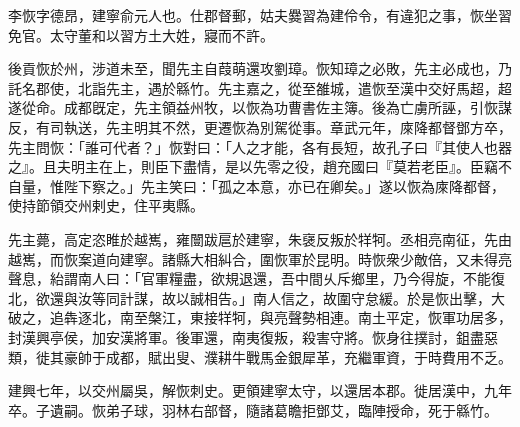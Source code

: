 \begin{pinyinscope}
 
 
 李恢字德昂，建寧俞元人也。仕郡督郵，姑夫爨習為建伶令，有違犯之事，恢坐習免官。太守董和以習方土大姓，寢而不許。
 
 
 後貢恢於州，涉道未至，聞先主自葭萌還攻劉璋。恢知璋之必敗，先主必成也，乃託名郡使，北詣先主，遇於緜竹。先主嘉之，從至雒城，遣恢至漢中交好馬超，超遂從命。成都旣定，先主領益州牧，以恢為功曹書佐主簿。後為亡虜所誣，引恢謀反，有司執送，先主明其不然，更遷恢為別駕從事。章武元年，庲降都督鄧方卒，先主問恢：「誰可代者？」恢對曰：「人之才能，各有長短，故孔子曰『其使人也器之』。且夫明主在上，則臣下盡情，是以先零之役，趙充國曰『莫若老臣』。臣竊不自量，惟陛下察之。」先主笑曰：「孤之本意，亦已在卿矣。」遂以恢為庲降都督，使持節領交州剌史，住平夷縣。
 
 
 
 
 先主薨，高定恣睢於越嶲，雍闓跋扈於建寧，朱襃反叛於䍧牱。丞相亮南征，先由越嶲，而恢案道向建寧。諸縣大相糾合，圍恢軍於昆明。時恢衆少敵倍，又未得亮聲息，紿謂南人曰：「官軍糧盡，欲規退還，吾中間乆斥鄉里，乃今得旋，不能復北，欲還與汝等同計謀，故以誠相告。」南人信之，故圍守怠緩。於是恢出擊，大破之，追犇逐北，南至槃江，東接䍧牱，與亮聲勢相連。南土平定，恢軍功居多，封漢興亭侯，加安漢將軍。後軍還，南夷復叛，殺害守將。恢身往撲討，鉏盡惡類，徙其豪帥于成都，賦出叟、濮耕牛戰馬金銀犀革，充繼軍資，于時費用不乏。
 
 
 
 
 建興七年，以交州屬吳，解恢刺史。更領建寧太守，以還居本郡。徙居漢中，九年卒。子遺嗣。恢弟子球，羽林右部督，隨諸葛瞻拒鄧艾，臨陣授命，死于緜竹。
 
 
\end{pinyinscope}